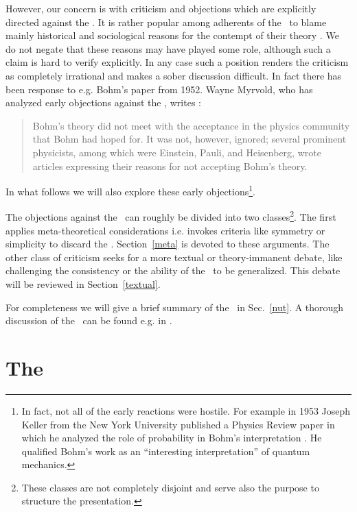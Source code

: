 However, our concern is with criticism and objections which are explicitly directed against the \dbb.
It is rather popular among adherents of the \dbb\ to blame mainly historical and sociological reasons for the contempt 
of their theory \cite{marabeller,cushing_qm,holland}. We do not negate that these reasons may have played some role, 
although such a claim is hard to verify explicitly. In any case such a position renders the criticism as completely 
irrational and makes a sober discussion difficult.
In fact there has been response to e.g. Bohm's paper from 1952. 
Wayne Myrvold, who has analyzed early objections against the \dbb, writes \cite{early} :
\begin{quote} 
Bohm's theory did not meet with the acceptance in the physics community that Bohm had hoped for. It was not, however, 
ignored; several prominent physicists, among which were Einstein, Pauli, and Heisenberg, wrote articles expressing their 
reasons for not accepting Bohm's theory.  
\end{quote}
In what follows we will also explore these early objections\footnote{In fact, not all of the early reactions were hostile.
For example in 1953 Joseph Keller from the 
New York University published a Physics Review paper in which he analyzed the role of probability in Bohm's 
interpretation \cite{keller}. He qualified Bohm's work as an ``interesting interpretation'' of quantum mechanics.}. 

The objections against the \dbb\ can roughly be divided into two classes\footnote{These classes are not completely disjoint and 
serve also the purpose to structure the presentation.}. 
The first applies  meta-theoretical considerations i.e. invokes criteria 
like symmetry or simplicity to discard the \dbb. Section~\ref{meta} is devoted to these arguments.
The other class of criticism seeks for a more textual or theory-immanent debate, like challenging the
consistency or the ability of the \dbb\ to be generalized. This debate will be reviewed in Section~\ref{textual}.

For completeness we will give a brief summary of the \dbb\ in Sec.~\ref{nut}. A thorough discussion of the \dbb\ can be 
found e.g. in \cite{duerr,undivided,cushing_qm,holland,passon}.

\section{The \dbb\label{nut}}

